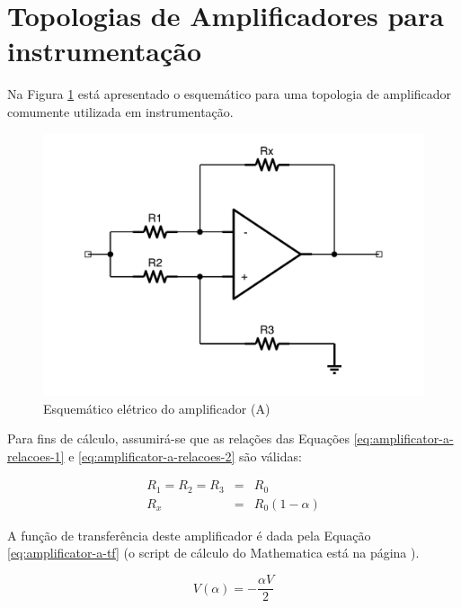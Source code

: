 \documentclass[a4paper]{instrumentacao}
\begin{document}
\section{Topologias de Amplificadores para instrumentação}


Na Figura \ref{fig:amplificador-a} está apresentado o esquemático para uma topologia de amplificador comumente utilizada em instrumentação.

\begin{figure}[H]
\center
\includegraphics[width=\textwidth]{Amplificador-A.pdf}
\caption{Esquemático elétrico do amplificador (A)}
\label{fig:amplificador-a}
\end{figure}

Para fins de cálculo, assumirá-se que as relações das Equações \ref{eq:amplificator-a-relacoes-1} e \ref{eq:amplificator-a-relacoes-2} são válidas:

\begin{eqnarray}
	R_1 = R_2 = R_3 &=& R_0 \label{eq:amplificator-a-relacoes-1} \\
	R_x &=& R_0(1-\alpha) 	\label{eq:amplificator-a-relacoes-2} 
\end{eqnarray}

A função de transferência\cite{ti-amplificador} deste amplificador é dada pela Equação \ref{eq:amplificator-a-tf} (o script de cálculo do Mathematica está na página \pageref{att:amplificadores}).

\begin{equation}
	V(\alpha) = -\frac{\alpha  V}{2}
	\label{eq:amplificator-a-tf}
\end{equation}
\end{document}
